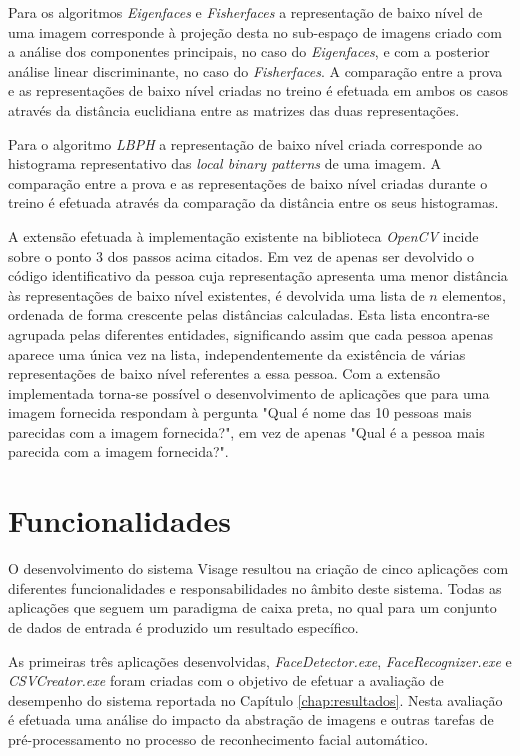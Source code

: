 Para os algoritmos \textit{Eigenfaces} e \textit{Fisherfaces} a representação de baixo nível de uma imagem corresponde à projeção desta no sub-espaço de imagens criado com a análise dos componentes principais, no caso do \textit{Eigenfaces}, e com a posterior análise linear discriminante, no caso do \textit{Fisherfaces}. A comparação entre a prova e as representações de baixo nível criadas no treino é efetuada em ambos os casos através da distância euclidiana entre as matrizes das duas representações.

Para o algoritmo \textit{LBPH} a representação de baixo nível criada corresponde ao histograma representativo das \textit{local binary patterns} de uma imagem. A comparação entre a prova e as representações de baixo nível criadas durante o treino é efetuada através da comparação da distância entre os seus histogramas.

A extensão efetuada à implementação existente na biblioteca \textit{OpenCV} incide sobre o ponto 3 dos passos acima citados. Em vez de apenas ser devolvido o código identificativo da pessoa cuja representação apresenta uma menor distância às representações de baixo nível existentes, é devolvida uma lista de $n$ elementos, ordenada de forma crescente pelas distâncias calculadas. Esta lista encontra-se agrupada pelas diferentes entidades, significando assim que cada pessoa apenas aparece uma única vez na lista, independentemente da existência de várias representações de baixo nível referentes a essa pessoa. Com a extensão implementada torna-se possível o desenvolvimento de aplicações que para uma imagem fornecida respondam à pergunta "Qual é nome das 10 pessoas mais parecidas com a imagem fornecida?", em vez de apenas "Qual é a pessoa mais parecida com a imagem fornecida?".

\section{Funcionalidades} \label{sec:funcionalidades}
O desenvolvimento do sistema Visage resultou na criação de cinco aplicações com diferentes funcionalidades e responsabilidades no âmbito deste sistema. Todas as aplicações que seguem um paradigma de caixa preta, no qual para um conjunto de dados de entrada é produzido um resultado específico. 

As primeiras três aplicações desenvolvidas, \textit{FaceDetector.exe}, \textit{FaceRecognizer.exe} e \textit{CSVCreator.exe} foram criadas com o objetivo de efetuar a avaliação de desempenho do sistema reportada no Capítulo \ref{chap:resultados}. Nesta avaliação é efetuada uma análise do impacto da abstração de imagens e outras tarefas de pré-processamento no processo de reconhecimento facial automático.

